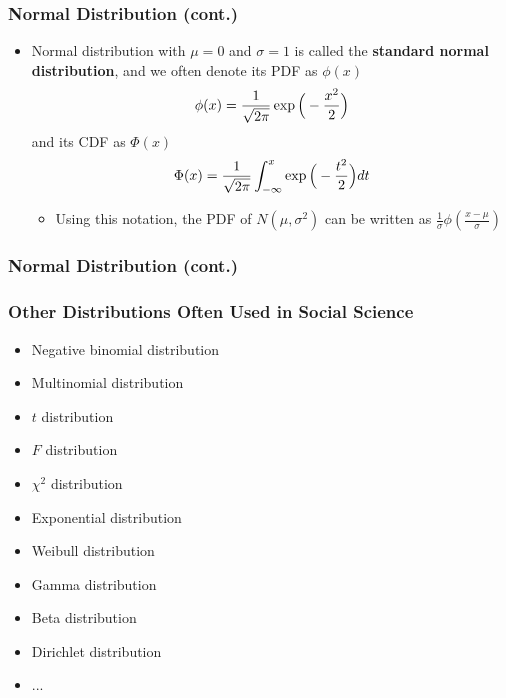 \documentclass[pdflatex, 12pt]{beamer}
\begin{document}
\begin{frame}
\frametitle{Normal Distribution (cont.)}
\begin{itemize}
\item Normal distribution with $\mu = 0$ and $\sigma = 1$ is called the \textbf{standard normal distribution}, and we often denote its PDF as $\phi(x)$ 
 \begin{equation}
 \phi(x) = \frac{1}{\sqrt{2\pi}} \exp\Big(-\frac{x^2}{2}\Big) \notag
 \end{equation}
and its CDF as $\Phi(x)$
 \begin{equation}
 \Phi(x) = \frac{1}{\sqrt{2\pi}} \int_{-\infty}^x \exp\Big(-\frac{t^2}{2}\Big) dt \notag
 \end{equation}
 \begin{itemize}
 \item Using this notation, the PDF of $N(\mu, \sigma^2)$ can be written as $\frac{1}{\sigma}\phi(\frac{x - \mu}{\sigma})$
 \end{itemize}
\end{itemize}
\end{frame}

\begin{frame}
\frametitle{Normal Distribution (cont.)}
\end{frame}

\begin{frame}
\frametitle{Other Distributions Often Used in Social Science}
\begin{itemize}
\item Negative binomial distribution
\item Multinomial distribution
\item $t$ distribution
\item $F$ distribution
\item $\chi^2$ distribution
\item Exponential distribution
\item Weibull distribution
\item Gamma distribution
\item Beta distribution
\item Dirichlet distribution
\item ...
\end{itemize}
\end{frame}
\end{document}
